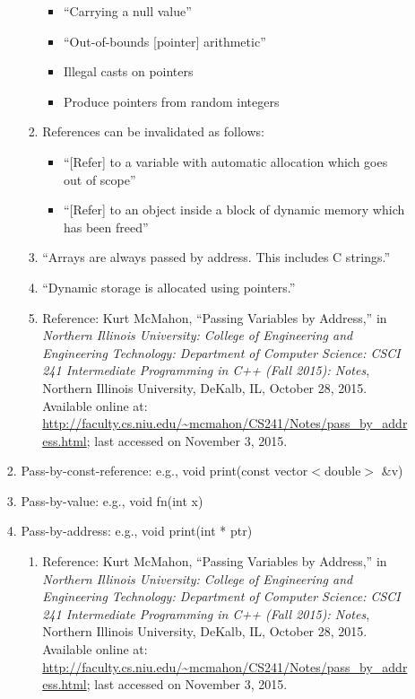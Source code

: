 \begin{enumerate}
\begin{enumerate}
\begin{enumerate}
\begin{enumerate}
				\begin{itemize} \itemsep -1pt
				\item ``Carrying a null value''
				\item ``Out-of-bounds [pointer] arithmetic''
				\item Illegal casts on pointers
				\item Produce pointers from random integers
				\end{itemize}
			\item References can be invalidated as follows: \vspace{-0.1cm}
				\begin{itemize} \itemsep -1pt
				\item ``[Refer] to a variable with automatic allocation which goes out of scope''
				\item ``[Refer] to an object inside a block of dynamic memory which has been freed''
				\end{itemize}
			\item ``Arrays are always passed by address. This includes C strings.''
			\item ``Dynamic storage is allocated using pointers.''
			\item Reference: Kurt McMahon, ``Passing Variables by Address,'' in {\it Northern Illinois University: College of Engineering and Engineering Technology: Department of Computer Science: CSCI 241 Intermediate Programming in C++ (Fall 2015): Notes}, Northern Illinois University, DeKalb, IL, October 28, 2015. Available online at: \url{http://faculty.cs.niu.edu/~mcmahon/CS241/Notes/pass_by_address.html}; last accessed on November 3, 2015.
			\end{enumerate}
		\item Pass-by-const-reference: e.g., void print(const vector$<$double$>$ \&v)
		\item Pass-by-value: e.g., void fn(int x)
		\item Pass-by-address: e.g., void print(int * ptr) \vspace{-0.1cm}
			\begin{enumerate} \itemsep -1pt
			\item Reference: Kurt McMahon, ``Passing Variables by Address,'' in {\it Northern Illinois University: College of Engineering and Engineering Technology: Department of Computer Science: CSCI 241 Intermediate Programming in C++ (Fall 2015): Notes}, Northern Illinois University, DeKalb, IL, October 28, 2015. Available online at: \url{http://faculty.cs.niu.edu/~mcmahon/CS241/Notes/pass_by_address.html}; last accessed on November 3, 2015.

\end{enumerate}
\end{enumerate}
\end{enumerate}
\end{enumerate}
